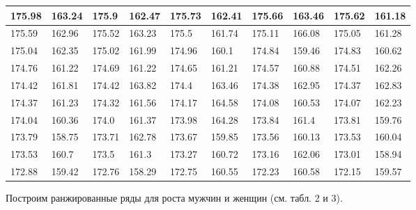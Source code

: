 \begin{longtable}{|p{1.3cm}|p{1.3cm}|p{1.3cm}|p{1.3cm}|p{1.3cm}|p{1.3cm}|p{1.3cm}|p{1.3cm}|p{1.3cm}|p{1.3cm}|}
    175.98 & 163.24 & 175.9  & 162.47 & 175.73 & 162.41 & 175.66 & 163.46 & 175.62 & 161.18 \\\hline
    175.59 & 162.96 & 175.52 & 163.23 & 175.5  & 161.74 & 175.11 & 166.08 & 175.05 & 161.28 \\\hline
    175.04 & 162.35 & 175.02 & 161.99 & 174.96 & 160.1  & 174.84 & 159.46 & 174.83 & 160.62 \\\hline
    174.76 & 161.22 & 174.69 & 161.22 & 174.65 & 161.21 & 174.57 & 160.88 & 174.51 & 162.26 \\\hline
    174.42 & 161.81 & 174.42 & 163.82 & 174.4  & 163.46 & 174.38 & 162.95 & 174.37 & 162.83 \\\hline
    174.37 & 161.23 & 174.32 & 161.56 & 174.17 & 164.58 & 174.08 & 160.53 & 174.07 & 162.23 \\\hline
    174.04 & 160.36 & 174.0  & 161.37 & 173.98 & 164.28 & 173.84 & 161.4  & 173.81 & 159.76 \\\hline
    173.79 & 158.75 & 173.71 & 162.78 & 173.67 & 159.85 & 173.56 & 160.13 & 173.53 & 160.04 \\\hline
    173.53 & 160.7  & 173.5  & 161.3  & 173.27 & 160.72 & 173.16 & 162.06 & 173.01 & 158.94 \\\hline
    172.88 & 159.42 & 172.76 & 158.29 & 172.75 & 160.55 & 172.23 & 160.58 & 172.15 & 159.57 \\\hline
\end{longtable}

Построим ранжированные ряды для роста мужчин и женщин (см. табл. 2 и 3).

